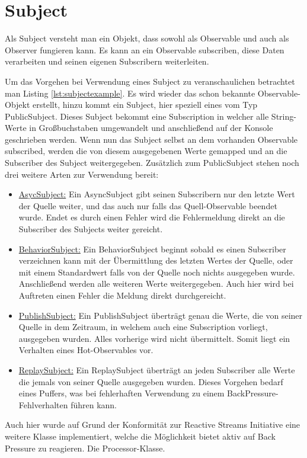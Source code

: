 \section{Subject}
Als Subject versteht man ein Objekt, dass sowohl als Observable und auch als Observer fungieren kann. Es kann an ein Observable subscriben, diese Daten verarbeiten und seinen eigenen Subscribern weiterleiten. 

Um das Vorgehen bei Verwendung eines Subject zu veranschaulichen betrachtet man Listing \ref{lst:subjectexample}. Es wird wieder das schon bekannte Observable-Objekt erstellt, hinzu kommt ein Subject, hier speziell eines vom Typ PublicSubject. Dieses Subject bekommt eine Subscription in welcher alle String-Werte in Großbuchstaben umgewandelt und anschließend auf der Konsole geschrieben werden. Wenn nun das Subject selbst an dem vorhanden Observable subscribed, werden die von diesem ausgegebenen Werte gemapped und an die Subscriber des Subject weitergegeben. Zusätzlich zum PublicSubject stehen noch drei weitere Arten zur Verwendung bereit:
\begin{itemize}
	\item \underline{AsycSubject:} Ein AsyncSubject gibt seinen Subscribern nur den letzte Wert der Quelle weiter, und das auch nur falls das Quell-Observable beendet wurde. Endet es durch einen Fehler wird die Fehlermeldung direkt an die Subscriber des Subjects weiter gereicht.
	\item \underline{BehaviorSubject:} Ein BehaviorSubject beginnt sobald es einen Subscriber verzeichnen kann mit der Übermittlung des letzten Wertes der Quelle, oder mit einem Standardwert falls von der Quelle noch nichts ausgegeben wurde. Anschließend werden alle weiteren Werte weitergegeben. Auch hier wird bei Auftreten einen Fehler die Meldung direkt durchgereicht.
	\item \underline{PublishSubject:} Ein PublishSubject überträgt genau die Werte, die von seiner Quelle in dem Zeitraum, in welchem auch eine Subscription vorliegt, ausgegeben wurden. Alles vorherige wird nicht übermittelt. Somit liegt ein Verhalten eines Hot-Observables vor.
	\item \underline{ReplaySubject:} Ein ReplaySubject überträgt an jeden Subscriber alle Werte die jemals von seiner Quelle ausgegeben wurden. Dieses Vorgehen bedarf eines Puffers, was bei fehlerhaften Verwendung zu einem BackPressure-Fehlverhalten führen kann. 
\end{itemize}
Auch hier wurde auf Grund der Konformität zur Reactive Streams Initiative eine weitere Klasse implementiert, welche die Möglichkeit bietet aktiv auf Back Pressure zu reagieren. Die Processor-Klasse.
